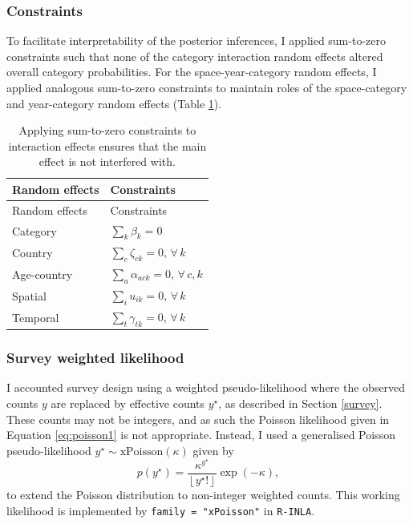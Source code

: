\documentclass[a4paper, nobind]{templates/ociamthesis}
\begin{document}
\hypertarget{constraints}{%
\subsubsection{Constraints}\label{constraints}}

To facilitate interpretability of the posterior inferences, I applied sum-to-zero constraints such that none of the category interaction random effects altered overall category probabilities.
For the space-year-category random effects, I applied analogous sum-to-zero constraints to maintain roles of the space-category and year-category random effects (Table \ref{tab:constraints}).

\begin{longtable}[]{@{}ll@{}}
\caption{\label{tab:constraints} Applying sum-to-zero constraints to interaction effects ensures that the main effect is not interfered with.}\tabularnewline
\toprule\noalign{}
Random effects & Constraints \\
\midrule\noalign{}
\endfirsthead
\toprule\noalign{}
Random effects & Constraints \\
\midrule\noalign{}
\endhead
\bottomrule\noalign{}
\endlastfoot
Category & \(\sum_k \beta_k = 0\) \\
Country & \(\sum_c \zeta_{ck} = 0, \, \forall \, k\) \\
Age-country & \(\sum_a \alpha_{ack} = 0, \, \forall \, c, k\) \\
Spatial & \(\sum_i u_{ik} = 0, \, \forall \, k\) \\
Temporal & \(\sum_t \gamma_{tk} = 0, \, \forall \, k\) \\
\end{longtable}

\hypertarget{survey-weighted-likelihood}{%
\subsubsection{Survey weighted likelihood}\label{survey-weighted-likelihood}}

I accounted survey design using a weighted pseudo-likelihood where the observed counts \(y\) are replaced by effective counts \(y^\star\), as described in Section \ref{survey}.
These counts may not be integers, and as such the Poisson likelihood given in Equation \eqref{eq:poisson1} is not appropriate.
Instead, I used a generalised Poisson pseudo-likelihood \(y^\star \sim \text{xPoisson}(\kappa)\) given by
\begin{equation}
    p(y^\star) = \frac{\kappa^{y^\star}}{\left \lfloor{y^\star!}\right \rfloor } \exp \left(- \kappa \right),
\end{equation}
to extend the Poisson distribution to non-integer weighted counts.
This working likelihood is implemented by \texttt{family\ =\ "xPoisson"} in \texttt{R-INLA}.
\end{document}
